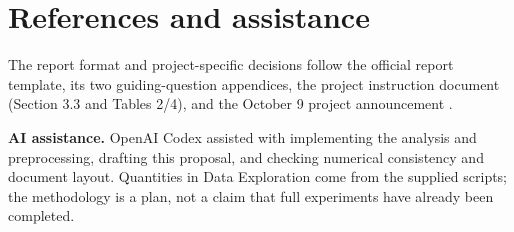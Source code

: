 \documentclass[12pt]{article}
\begin{document}
\clearpage
\section*{References and assistance}
The report format and project-specific decisions follow the official report
template, its two guiding-question appendices, the project instruction document
(Section 3.3 and Tables 2/4), and the October 9 project announcement
\cite{courserequirements,coursetemplate,courseupdate}.

\textbf{AI assistance.}
OpenAI Codex assisted with implementing the analysis and preprocessing, drafting
this proposal, and checking numerical consistency and document layout. Quantities
in Data Exploration come from the supplied scripts; the methodology is a plan,
not a claim that full experiments have already been completed.

\begingroup
\renewcommand{\section}[2]{}%


\endgroup
\end{document}
